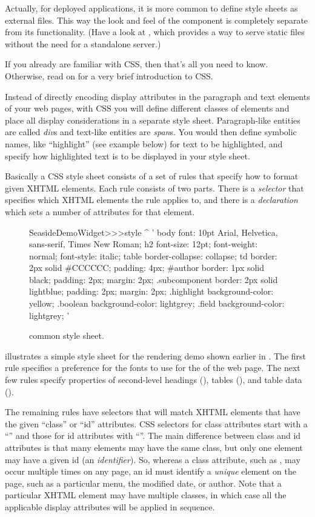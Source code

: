 \documentclass[a4paper,10pt,twoside]{book}
\begin{document}
Actually, for deployed applications, it is more common to define style sheets as external files.
This way the look and feel of the component is completely separate from its functionality.
(Have a look at , which provides a way to serve static files without the need for a standalone server.)

If you already are familiar with CSS, then that's all you need to know.
Otherwise, read on for a very brief introduction to CSS.

Instead of directly encoding display attributes in the paragraph and text elements of your web pages, with CSS you will define different classes of elements and place all display considerations in a separate style sheet.
Paragraph-like entities are called \emph{div}s and text-like entities are \emph{span}s.
You would then define symbolic names, like ``highlight'' (see example below) for text to be highlighted, and specify how highlighted text is to be displayed in your style sheet.

Basically a CSS style sheet consists of a set of rules that specify how to format given XHTML elements.
Each rule consists of two parts.
There is a \emph{selector} that specifies which XHTML elements the rule applies to, and there is a \emph{declaration} which sets a number of attributes for that element.

\begin{figure}[tb]
\begin{code}{}
SeasideDemoWidget>>>style
	^ '
body {
	font: 10pt Arial, Helvetica, sans-serif, Times New Roman;
}
h2 {
	font-size: 12pt;
	font-weight: normal;
	font-style: italic;
}
table { border-collapse: collapse; }
td {
	border: 2px solid #CCCCCC;
	padding: 4px;
}
#author {
	border: 1px solid black;
	padding: 2px;
	margin: 2px;
}
.subcomponent {
	border: 2px solid lightblue;
	padding: 2px;
	margin: 2px;
}
.highlight { background-color: yellow; }
.boolean { background-color: lightgrey; }
.field { background-color: lightgrey; }
'
\end{code}
\caption{ common style sheet.
}
\end{figure}
 illustrates a simple style sheet for the rendering demo shown earlier in .
The first rule specifies a preference for the fonts to use for the  of the web page.
The next few rules specify properties of second-level headings (), tables (), and table data ().

The remaining rules have selectors that will match XHTML elements that have the given ``class'' or ``id'' attributes.
CSS selectors for class attributes start with a ``'' and those for id attributes with ``\ct{#}''.
The main difference between class and id attributes is that many elements may have the same class, but only one element may have a given id (\ie an \emph{identifier}). 
So, whereas a class attribute, such as , may occur multiple times on any page, an id must identify a \emph{unique} element on the page, such as a particular menu, the modified date, or author.
Note that a particular XHTML element may have multiple classes, in which case all the applicable display attributes will be applied in sequence.
\end{document}
